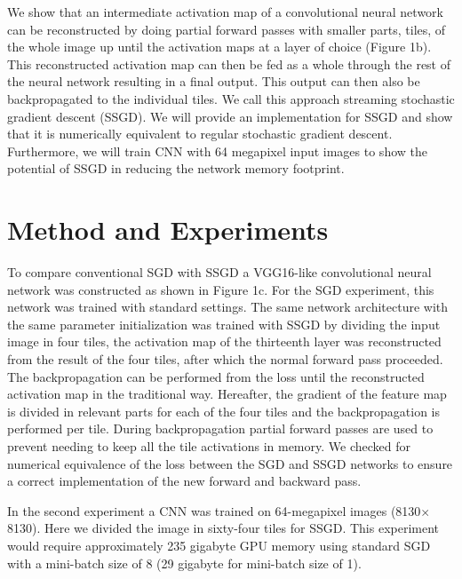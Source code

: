 \documentclass{article}
\begin{document}
We show that an intermediate activation map of a convolutional neural network can be reconstructed by doing partial forward passes with smaller parts, tiles, of the whole image up until the activation maps at a layer of choice (Figure 1b). This reconstructed activation map can then be fed as a whole through the rest of the neural network resulting in a final output. This output can then also be backpropagated to the individual tiles. We call this approach streaming stochastic gradient descent (SSGD). We will provide an implementation for SSGD and show that it is numerically equivalent to regular stochastic gradient descent. Furthermore, we will train CNN with 64 megapixel input images to show the potential of SSGD in reducing the network memory footprint.

\section{Method and Experiments}
\label{gen_inst}
To compare conventional SGD with SSGD a VGG16-like convolutional neural network was constructed as shown in Figure 1c. For the SGD experiment, this network was trained with standard settings. The same network architecture with the same parameter initialization was trained with SSGD by dividing the input image in four tiles, the activation map of the thirteenth layer was reconstructed from the result of the four tiles, after which the normal forward pass proceeded. The backpropagation can be performed from the loss until the reconstructed activation map in the traditional way. Hereafter, the gradient of the feature map is divided in relevant parts for each of the four tiles and the backpropagation is performed per tile. During backpropagation partial forward passes are used to prevent needing to keep all the tile activations in memory. We checked for numerical equivalence of the loss between the SGD and SSGD networks to ensure a correct implementation of the new forward and backward pass.

In the second experiment a CNN was trained on 64-megapixel images (8130$\times$8130). Here we divided the image in sixty-four tiles for SSGD. This experiment would require approximately 235 gigabyte GPU memory using standard SGD with a mini-batch size of 8 (29 gigabyte for mini-batch size of 1).
\end{document}
